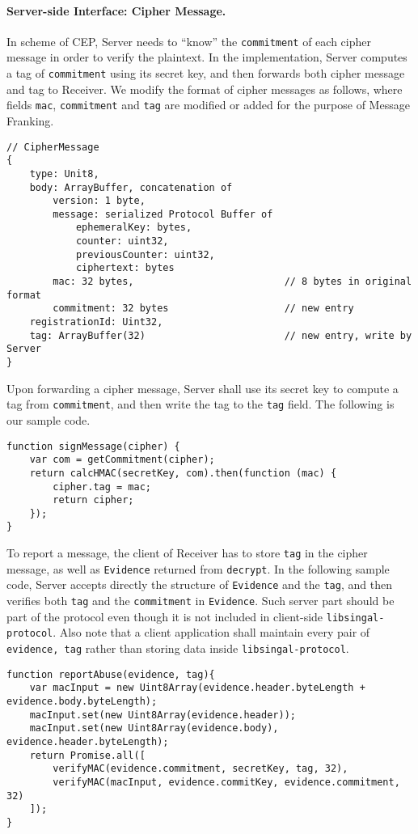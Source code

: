 \documentclass{article}
\begin{document}
\paragraph{Server-side Interface: Cipher Message.}
In scheme of CEP, Server needs to ``know'' 
the {\tt commitment} of each cipher message
in order to verify the plaintext.
In the implementation, 
Server computes a tag of {\tt commitment} using its secret key,
and then forwards both cipher message and tag to Receiver.
We modify the format of cipher messages as follows,
where fields {\tt mac}, {\tt commitment} and {\tt tag}
are modified or added for the purpose of Message Franking.
{\small
\begin{verbatim}
// CipherMessage
{
    type: Unit8, 
    body: ArrayBuffer, concatenation of
        version: 1 byte,
        message: serialized Protocol Buffer of
            ephemeralKey: bytes,
            counter: uint32, 
            previousCounter: uint32, 
            ciphertext: bytes
        mac: 32 bytes,                          // 8 bytes in original format
        commitment: 32 bytes                    // new entry
    registrationId: Uint32, 
    tag: ArrayBuffer(32)                        // new entry, write by Server
}
\end{verbatim}
}
Upon forwarding a cipher message,
Server shall use its secret key to compute a tag from {\tt commitment},
and then write the tag to the {\tt tag} field.
The following is our sample code.
{\small
\begin{verbatim}
function signMessage(cipher) {
    var com = getCommitment(cipher);
    return calcHMAC(secretKey, com).then(function (mac) {
        cipher.tag = mac;
        return cipher;
    });
}
\end{verbatim}
}
To report a message,
the client of Receiver has to store {\tt tag} in the cipher message,
as well as {\tt Evidence} returned from {\tt decrypt}.
In the following sample code, 
Server accepts directly the structure of {\tt Evidence} and the {\tt tag},
and then verifies both {\tt tag} and the {\tt commitment} in {\tt Evidence}.
Such server part should be part of the protocol
even though it is not included in client-side {\tt libsingal-protocol}.
Also note that a client application shall maintain every pair of 
{\tt evidence, tag} rather than storing data inside {\tt libsingal-protocol}. 
{\small
\begin{verbatim}
function reportAbuse(evidence, tag){
    var macInput = new Uint8Array(evidence.header.byteLength + evidence.body.byteLength);
    macInput.set(new Uint8Array(evidence.header));
    macInput.set(new Uint8Array(evidence.body), evidence.header.byteLength);
    return Promise.all([
        verifyMAC(evidence.commitment, secretKey, tag, 32),
        verifyMAC(macInput, evidence.commitKey, evidence.commitment, 32)
    ]);
}
\end{verbatim}
}
\end{document}

